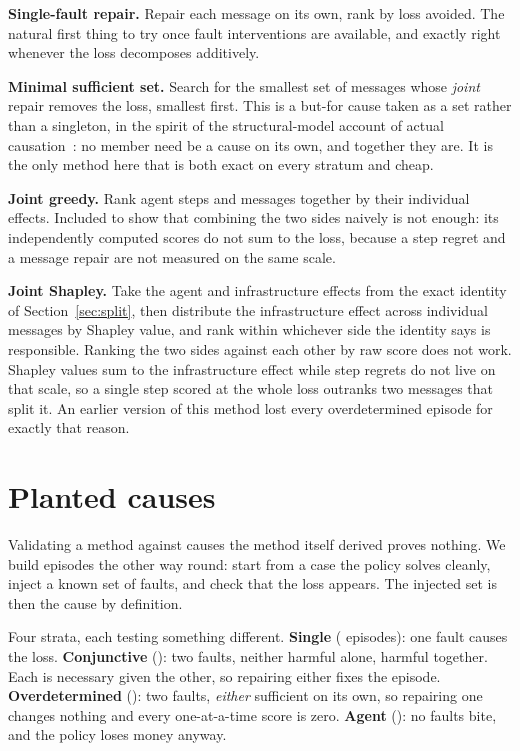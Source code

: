\documentclass[conference]{IEEEtran}
\begin{document}
\textbf{Single-fault repair.} Repair each message on its own, rank by loss
avoided. The natural first thing to try once fault interventions are available,
and exactly right whenever the loss decomposes additively.

\textbf{Minimal sufficient set.} Search for the smallest set of messages whose
\emph{joint} repair removes the loss, smallest first. This is a but-for cause
taken as a set rather than a singleton, in the spirit of the structural-model
account of actual causation~\cite{halpern2016}: no member need be a cause on
its own, and together they are. It is the only method here that is both exact
on every stratum and cheap.

\textbf{Joint greedy.} Rank agent steps and messages together by their
individual effects. Included to show that combining the two sides naively is not enough: its
independently computed scores do not sum to the loss, because a step regret
and a message repair are not measured on the same scale.

\textbf{Joint Shapley.} Take the agent and infrastructure effects from the exact
identity of Section~\ref{sec:split}, then distribute the infrastructure effect
across individual messages by Shapley value, and rank within whichever side the
identity says is responsible. Ranking the two sides against each other by raw score does not work. Shapley
values sum to the infrastructure effect while step regrets do not live on that
scale, so a single step scored at the whole loss outranks two messages that
split it. An earlier version of this method lost every overdetermined episode
for exactly that reason.

\section{Planted causes}
\label{sec:planted}

Validating a method against causes the method itself derived proves nothing. We
build episodes the other way round: start from a case the policy solves
cleanly, inject a known set of faults, and check that the loss appears. The
injected set is then the cause by definition.

Four strata, each testing something different. \textbf{Single}
(\nSingle{} episodes): one fault causes the loss. \textbf{Conjunctive}
(\nConjunctive): two faults, neither harmful alone, harmful together. Each is necessary given
the other, so repairing either fixes the episode.
\textbf{Overdetermined} (\nOverdetermined): two faults, \emph{either} sufficient
on its own, so repairing one changes nothing and every one-at-a-time score is
zero. \textbf{Agent} (\nAgentStratum): no faults bite, and the policy loses
money anyway.
\end{document}
